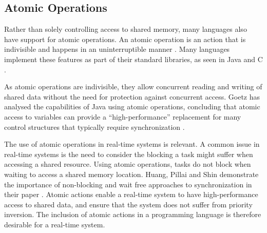 \subsection{Atomic Operations} %
Rather than solely controlling access to shared memory, many languages also have support 
for atomic operations. An atomic operation is an action that is
indivisible and happens in an uninterruptible manner
\cite{preshing}. Many languages implement these features as part of their
standard libraries, as seen in Java and C \cite{java-atomic,preshing}.  
\par\bigskip\noindent
As atomic operations are indivisible, they
allow concurrent reading and writing of shared data without the need for
protection against concurrent access. Goetz has analysed the capabilities of
Java using atomic operations, concluding that atomic access to variables can 
provide a ``high-performance'' replacement for
many control structures that typically require synchronization
\cite{java-ibm-atomic}.  
\par\bigskip\noindent
The use of atomic operations in real-time systems is relevant.  
A common issue in real-time systems is the need to consider the blocking a task
might suffer when accessing a shared resource. Using atomic operations, tasks 
do not block when waiting to access a shared memory location. Huang, Pillai and 
Shin demonstrate the importance of non-blocking and wait free approaches to 
synchronization in their paper \cite{Huang:2002:IWA:647057.713863}.
Atomic actions enable a real-time system to have high-performance
access to shared data, and ensure that the system does not suffer from 
priority inversion. The inclusion of atomic actions in a programming 
language is therefore desirable for a real-time system. 

